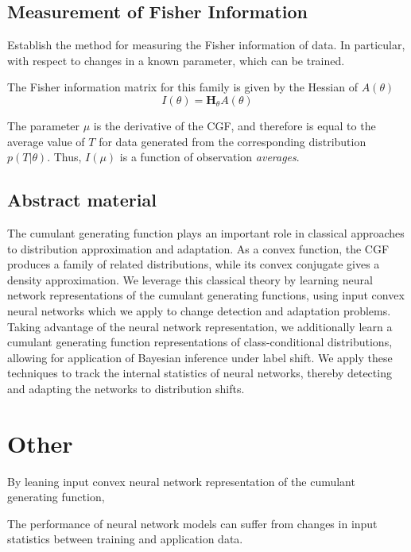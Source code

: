 \documentclass[11pt]{article}      %
\begin{document}
\subsection{Measurement of Fisher Information}

Establish the method for measuring the Fisher information of data. In particular, with respect to changes in a known parameter, which can be trained.



The Fisher information matrix for this family is given by the Hessian of $A(\theta)$ 
\begin{equation}
  I(\theta) = \bm{H}_\theta A(\theta) 
\end{equation}

The parameter $\mu$ is the derivative of the CGF, and therefore is equal to the average value of $T$ for data generated from the corresponding distribution $p(T|\theta)$.
Thus, $I(\mu)$ is a function of observation \textit{averages}.

\subsection{Abstract material}


The cumulant generating function plays an important role in classical approaches to distribution approximation and adaptation.
As a convex function, the CGF produces a family of related distributions, while its convex conjugate gives a density approximation.
We leverage this classical theory by learning neural network representations of the cumulant generating functions, using input convex neural networks which we apply to change detection and adaptation problems.
Taking advantage of the neural network representation, we additionally learn a cumulant generating function representations of class-conditional distributions, allowing for application of Bayesian inference under label shift.
We apply these techniques to track the internal statistics of neural networks, thereby detecting and adapting the networks to distribution shifts.




\section{Other}
By leaning input convex neural network representation of the cumulant generating function, 


The performance of neural network models can suffer from changes in input statistics between training and application data.
\end{document}
